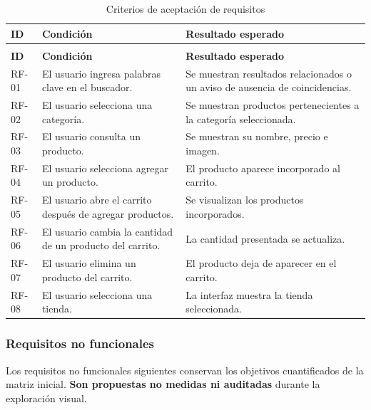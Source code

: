 \documentclass[12pt,a4paper]{article}
\renewcommand{\arraystretch}{1.17}
\begin{document}
\begingroup
\footnotesize
\setlength{\tabcolsep}{3pt}
\renewcommand{\arraystretch}{1.22}
\begin{longtable}{|>{\raggedright\arraybackslash}p{1.55cm}|>{\raggedright\arraybackslash}p{6.0cm}|>{\raggedright\arraybackslash}p{6.4cm}|}
\caption{Criterios de aceptación de requisitos}\\
\hline
\textbf{ID} & \textbf{Condición} & \textbf{Resultado esperado} \\
\hline
\endfirsthead
\multicolumn{3}{c}{\textit{Continuación: Criterios de aceptación de requisitos}}\\
\hline
\textbf{ID} & \textbf{Condición} & \textbf{Resultado esperado} \\
\hline
\endhead
RF-01 & El usuario ingresa palabras clave en el buscador. & Se muestran resultados relacionados o un aviso de ausencia de coincidencias. \\
\hline
RF-02 & El usuario selecciona una categoría. & Se muestran productos pertenecientes a la categoría seleccionada. \\
\hline
RF-03 & El usuario consulta un producto. & Se muestran su nombre, precio e imagen. \\
\hline
RF-04 & El usuario selecciona agregar un producto. & El producto aparece incorporado al carrito. \\
\hline
RF-05 & El usuario abre el carrito después de agregar productos. & Se visualizan los productos incorporados. \\
\hline
RF-06 & El usuario cambia la cantidad de un producto del carrito. & La cantidad presentada se actualiza. \\
\hline
RF-07 & El usuario elimina un producto del carrito. & El producto deja de aparecer en el carrito. \\
\hline
RF-08 & El usuario selecciona una tienda. & La interfaz muestra la tienda seleccionada. \\
\hline
\end{longtable}
\endgroup

\subsubsection{Requisitos no funcionales}
Los requisitos no funcionales siguientes conservan los objetivos cuantificados de la matriz inicial. \textbf{Son propuestas no medidas ni auditadas} durante la exploración visual.
\end{document}
